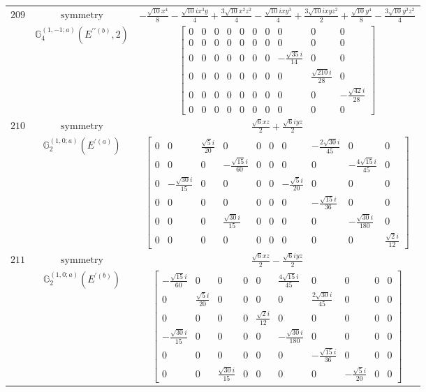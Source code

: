 \documentclass[fleqn,8pt,landscape]{jsarticle}
\begin{document}
\begin{longtable}{ccc}
$ 209 $ & $ \text{symmetry} $ & $ - \frac{\sqrt{10} x^{4}}{8} - \frac{\sqrt{10} i x^{3} y}{4} + \frac{3 \sqrt{10} x^{2} z^{2}}{4} - \frac{\sqrt{10} i x y^{3}}{4} + \frac{3 \sqrt{10} i x y z^{2}}{2} + \frac{\sqrt{10} y^{4}}{8} - \frac{3 \sqrt{10} y^{2} z^{2}}{4} $ \\
$  $ & $ \mathbb{G}_{4}^{(1,-1;a)}(E^{\prime\prime(b)},2) $ & $ \begin{bmatrix} 0 & 0 & 0 & 0 & 0 & 0 & 0 & 0 & 0 & 0 \\ 0 & 0 & 0 & 0 & 0 & 0 & 0 & 0 & 0 & 0 \\ 0 & 0 & 0 & 0 & 0 & 0 & 0 & - \frac{\sqrt{35} i}{14} & 0 & 0 \\ 0 & 0 & 0 & 0 & 0 & 0 & 0 & 0 & \frac{\sqrt{210} i}{28} & 0 \\ 0 & 0 & 0 & 0 & 0 & 0 & 0 & 0 & 0 & - \frac{\sqrt{42} i}{28} \\ 0 & 0 & 0 & 0 & 0 & 0 & 0 & 0 & 0 & 0 \end{bmatrix} $ \\ \hline
$ 210 $ & $ \text{symmetry} $ & $ \frac{\sqrt{6} x z}{2} + \frac{\sqrt{6} i y z}{2} $ \\
$  $ & $ \mathbb{G}_{2}^{(1,0;a)}(E^{\prime(a)}) $ & $ \begin{bmatrix} 0 & 0 & \frac{\sqrt{5} i}{20} & 0 & 0 & 0 & 0 & - \frac{2 \sqrt{30} i}{45} & 0 & 0 \\ 0 & 0 & 0 & - \frac{\sqrt{15} i}{60} & 0 & 0 & 0 & 0 & - \frac{4 \sqrt{15} i}{45} & 0 \\ 0 & - \frac{\sqrt{30} i}{15} & 0 & 0 & 0 & 0 & - \frac{\sqrt{5} i}{20} & 0 & 0 & 0 \\ 0 & 0 & 0 & 0 & 0 & 0 & 0 & - \frac{\sqrt{15} i}{36} & 0 & 0 \\ 0 & 0 & 0 & \frac{\sqrt{30} i}{15} & 0 & 0 & 0 & 0 & - \frac{\sqrt{30} i}{180} & 0 \\ 0 & 0 & 0 & 0 & 0 & 0 & 0 & 0 & 0 & \frac{\sqrt{2} i}{12} \end{bmatrix} $ \\ \hline
$ 211 $ & $ \text{symmetry} $ & $ \frac{\sqrt{6} x z}{2} - \frac{\sqrt{6} i y z}{2} $ \\
$  $ & $ \mathbb{G}_{2}^{(1,0;a)}(E^{\prime(b)}) $ & $ \begin{bmatrix} - \frac{\sqrt{15} i}{60} & 0 & 0 & 0 & 0 & \frac{4 \sqrt{15} i}{45} & 0 & 0 & 0 & 0 \\ 0 & \frac{\sqrt{5} i}{20} & 0 & 0 & 0 & 0 & \frac{2 \sqrt{30} i}{45} & 0 & 0 & 0 \\ 0 & 0 & 0 & 0 & \frac{\sqrt{2} i}{12} & 0 & 0 & 0 & 0 & 0 \\ - \frac{\sqrt{30} i}{15} & 0 & 0 & 0 & 0 & - \frac{\sqrt{30} i}{180} & 0 & 0 & 0 & 0 \\ 0 & 0 & 0 & 0 & 0 & 0 & - \frac{\sqrt{15} i}{36} & 0 & 0 & 0 \\ 0 & 0 & \frac{\sqrt{30} i}{15} & 0 & 0 & 0 & 0 & - \frac{\sqrt{5} i}{20} & 0 & 0 \end{bmatrix} $ \\ \hline

\end{longtable}
\end{document}
